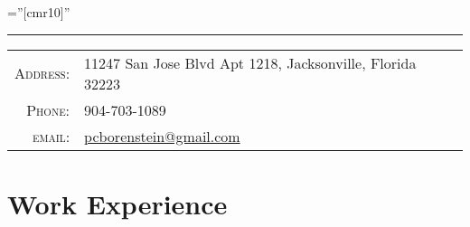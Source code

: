 \documentclass[a4paper,10pt]{article} %
\begin{document}
\pagestyle{empty} %

\font\fb=''[cmr10]'' %


\par{\bigskip\par} %
\noindent\rule{14.3cm}{0.4pt}

\begin{tabular}{rl}
\textsc{Address:} &11247 San Jose Blvd Apt 1218, Jacksonville, Florida 32223 \\
\textsc{Phone:} & 904-703-1089\\
\textsc{email:} & \href{mailto:pcborenstein@gmail.com}{pcborenstein@gmail.com}
\end{tabular}


\section{Work Experience}
\end{document}
